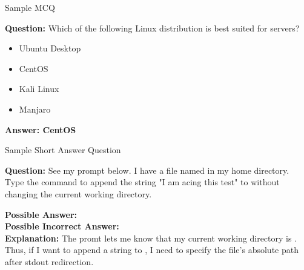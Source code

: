 \begin{step}[colframe=odblue]{Sample MCQ}
    
\textbf{Question:} Which of the following Linux distribution is best suited for servers?

        \begin{itemize}
            \item Ubuntu Desktop
            \item CentOS
            \item Kali Linux
            \item Manjaro
        \end{itemize}

\textbf{Answer: CentOS}

\end{step}

\begin{step}[colframe=odblue]{Sample Short Answer Question}
    
\textbf{Question:} See my prompt below. I have a file named  in my home directory. Type the command to append the string "I am acing this test" to  without changing the current working directory.


\textbf{Possible Answer:} \\

\textbf{Possible Incorrect Answer:} \\

\textbf{Explanation:} The promt lets me know that my current working directory is . Thus, if I want to append a string to , I need to specify the file's absolute path after stdout redirection.

\end{step} 

